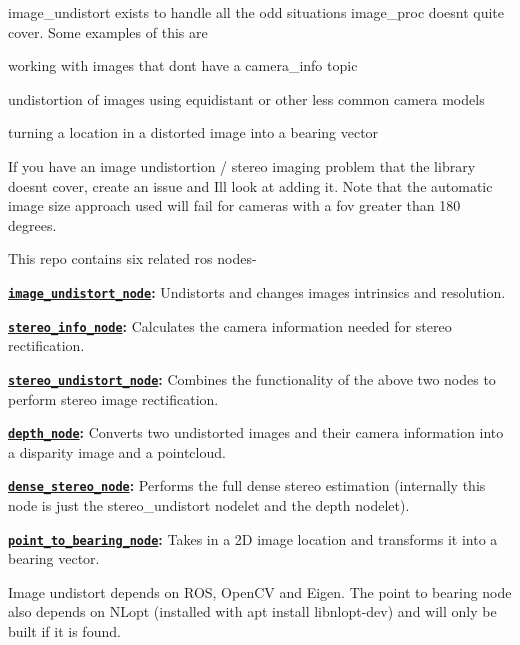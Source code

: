 image\+\_\+undistort exists to handle all the odd situations image\+\_\+proc doesn\textquotesingle{}t quite cover. Some examples of this are
\begin{DoxyItemize}
\item working with images that don\textquotesingle{}t have a camera\+\_\+info topic
\item undistortion of images using equidistant or other less common camera models
\item turning a location in a distorted image into a bearing vector
\end{DoxyItemize}

If you have an image undistortion / stereo imaging problem that the library doesn\textquotesingle{}t cover, create an issue and I\textquotesingle{}ll look at adding it. Note that the automatic image size approach used will fail for cameras with a fov greater than 180 degrees.

This repo contains six related ros nodes-\/
\begin{DoxyItemize}
\item {\bfseries \href{#image_undistort_node}{\tt image\+\_\+undistort\+\_\+node}\+:} Undistorts and changes images intrinsics and resolution.
\item {\bfseries \href{#stereo_info_node}{\tt stereo\+\_\+info\+\_\+node}\+:} Calculates the camera information needed for stereo rectification.
\item {\bfseries \href{#stereo_undistort_node}{\tt stereo\+\_\+undistort\+\_\+node}\+:} Combines the functionality of the above two nodes to perform stereo image rectification.
\item {\bfseries \href{#depth_node}{\tt depth\+\_\+node}\+:} Converts two undistorted images and their camera information into a disparity image and a pointcloud.
\item {\bfseries \href{#dense_stereo_node}{\tt dense\+\_\+stereo\+\_\+node}\+:} Performs the full dense stereo estimation (internally this node is just the stereo\+\_\+undistort nodelet and the depth nodelet).
\item {\bfseries \href{#point_to_bearing_node}{\tt point\+\_\+to\+\_\+bearing\+\_\+node}\+:} Takes in a 2D image location and transforms it into a bearing vector.
\end{DoxyItemize}

Image undistort depends on R\+OS, Open\+CV and Eigen. The point to bearing node also depends on N\+Lopt (installed with {\ttfamily apt install libnlopt-\/dev}) and will only be built if it is found.

